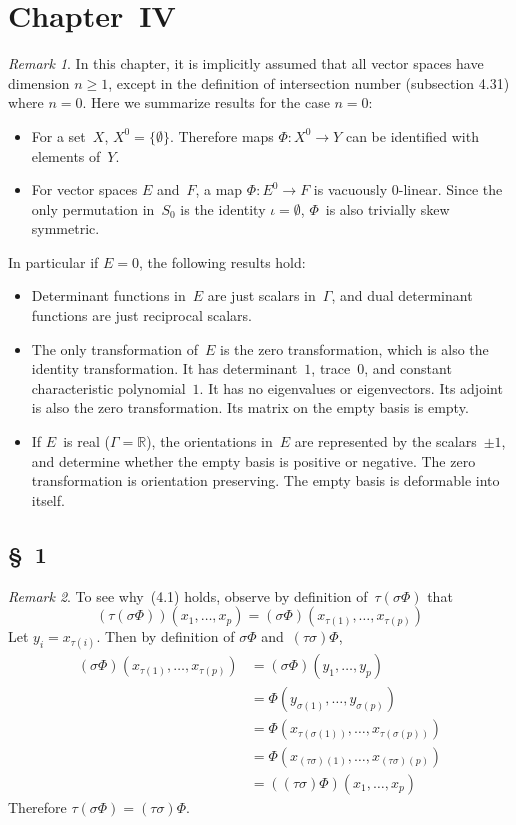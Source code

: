 \documentclass[letterpaper,12pt]{article}
\newcommand{\R}{\mathbb{R}}
\theoremstyle{definition}
\theoremstyle{remark}
\newtheorem*{rmk}{Remark}
\begin{document}
\section*{Chapter~IV}
\begin{rmk}
In this chapter, it is implicitly assumed that all vector spaces have dimension \(n\ge 1\), except in the definition of intersection number (subsection 4.31) where \(n=0\). Here we summarize results for the case \(n=0\):
\begin{itemize}
\item For a set~\(X\), \(X^0=\{\emptyset\}\). Therefore maps \(\Phi:X^0\to Y\) can be identified with elements of~\(Y\).
\item For vector spaces \(E\) and~\(F\), a map \(\Phi:E^0\to F\) is vacuously \(0\)-linear. Since the only permutation in~\(S_0\) is the identity \(\iota=\emptyset\), \(\Phi\)~is also trivially skew symmetric.
\end{itemize}
In particular if \(E=0\), the following results hold:
\begin{itemize}
\item Determinant functions in~\(E\) are just scalars in~\(\Gamma\), and dual determinant functions are just reciprocal scalars.
\item The only transformation of~\(E\) is the zero transformation, which is also the identity transformation. It has determinant~\(1\), trace~\(0\), and constant characteristic polynomial~\(1\). It has no eigenvalues or eigenvectors. Its adjoint is also the zero transformation. Its matrix on the empty basis is empty.
\item If \(E\)~is real (\(\Gamma=\R\)), the orientations in~\(E\) are represented by the scalars~\(\pm 1\), and determine whether the empty basis is positive or negative. The zero transformation is orientation preserving. The empty basis is deformable into itself.
\end{itemize}
\end{rmk}

\subsection*{\S~1}
\begin{rmk} To see why~(4.1) holds, observe by definition of~\(\tau(\sigma\Phi)\) that
\[(\tau(\sigma\Phi))(x_1,\ldots,x_p)=(\sigma\Phi)(x_{\tau(1)},\ldots,x_{\tau(p)})\]
Let \(y_i=x_{\tau(i)}\). Then by definition of \(\sigma\Phi\) and~\((\tau\sigma)\Phi\),
\begin{align*}
(\sigma\Phi)(x_{\tau(1)},\ldots,x_{\tau(p)})&=(\sigma\Phi)(y_1,\ldots,y_p)\\
	&=\Phi(y_{\sigma(1)},\ldots,y_{\sigma(p)})\\
	&=\Phi(x_{\tau(\sigma(1))},\ldots,x_{\tau(\sigma(p))})\\
	&=\Phi(x_{(\tau\sigma)(1)},\ldots,x_{(\tau\sigma)(p)})\\
	&=((\tau\sigma)\Phi)(x_1,\ldots,x_p)
\end{align*}
Therefore \(\tau(\sigma\Phi)=(\tau\sigma)\Phi\).
\end{rmk}
\end{document}
